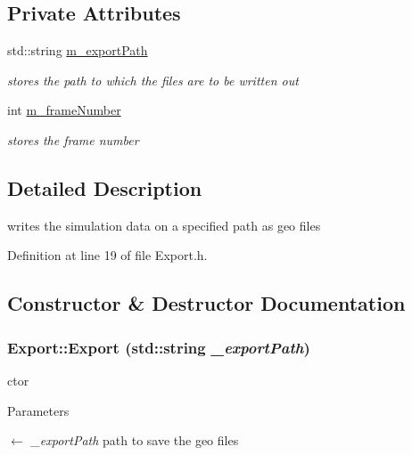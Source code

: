 \subsection*{Private Attributes}
\begin{DoxyCompactItemize}
\item 
std::string \hyperlink{class_export_a118e0991b8d0a147dabb306f2baa7d42}{m\_\-exportPath}
\begin{DoxyCompactList}\small\item\em stores the path to which the files are to be written out \item\end{DoxyCompactList}\item 
int \hyperlink{class_export_aba7efe1cc8dc348c756d65868a9bc929}{m\_\-frameNumber}
\begin{DoxyCompactList}\small\item\em stores the frame number \item\end{DoxyCompactList}\end{DoxyCompactItemize}


\subsection{Detailed Description}
writes the simulation data on a specified path as geo files 

Definition at line 19 of file Export.h.



\subsection{Constructor \& Destructor Documentation}
\hypertarget{class_export_a4d7d6897c99839d1bc1571c51018bec8}{
\subsubsection[{Export}]{\setlength{\rightskip}{0pt plus 5cm}Export::Export (std::string {\em \_\-exportPath})}}
\label{class_export_a4d7d6897c99839d1bc1571c51018bec8}


ctor 


\begin{DoxyParams}{Parameters}
\item[\mbox{$\leftarrow$} {\em \_\-exportPath}]path to save the geo files \end{DoxyParams}


